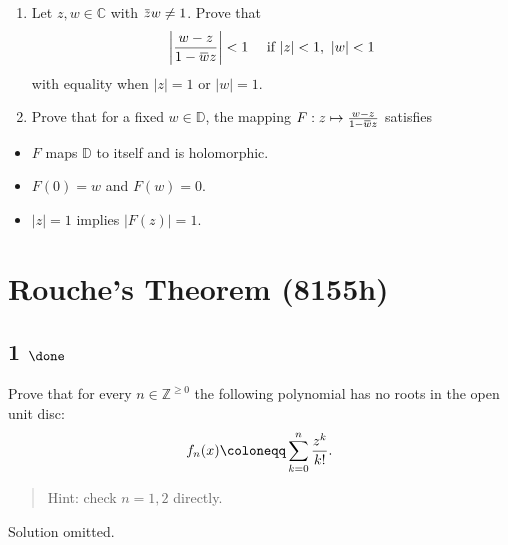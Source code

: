 \begin{enumerate}
\def\labelenumi{\alph{enumi}.}
\item
  Let \(z, w \in {\mathbb{C}}\) with
  \(\mkern 1.5mu\overline{\mkern-1.5muz\mkern-1.5mu}\mkern 1.5mu w \neq 1\).
  Prove that
  \begin{align*}
  {\left\lvert {w-z \over 1 - \mkern 1.5mu\overline{\mkern-1.5muw\mkern-1.5mu}\mkern 1.5mu z} \right\rvert} < 1 \quad\text{ if } {\left\lvert {z} \right\rvert}<1,~ {\left\lvert {w} \right\rvert} < 1
  \end{align*}
  with equality when \({\left\lvert {z} \right\rvert} = 1\) or
  \({\left\lvert {w} \right\rvert} = 1\).
\item
  Prove that for a fixed \(w\in {\mathbb{D}}\), the mapping
  \(F: z\mapsto {w-z \over 1 - \mkern 1.5mu\overline{\mkern-1.5muw\mkern-1.5mu}\mkern 1.5mu z}\)
  satisfies
\end{enumerate}

\begin{itemize}
\tightlist
\item
  \(F\) maps \({\mathbb{D}}\) to itself and is holomorphic.
\item
  \(F(0) = w\) and \(F(w) = 0\).
\item
  \({\left\lvert {z} \right\rvert} = 1\) implies
  \({\left\lvert {F(z)} \right\rvert} = 1\).
\end{itemize}

\hypertarget{rouches-theorem-8155h}{%
\section{Rouche's Theorem (8155h)}\label{rouches-theorem-8155h}}

\hypertarget{done-9}{%
\subsection{\texorpdfstring{1
\(\done\)}{1 \textbackslash done}}\label{done-9}}

Prove that for every \(n\in {\mathbb{Z}}^{\geq 0}\) the following
polynomial has no roots in the open unit disc:
\begin{align*}
f_n(x) \coloneqq\sum_{k=0}^n {z^k \over k!}
.\end{align*}

\begin{quote}
Hint: check \(n=1,2\) directly.
\end{quote}

Solution omitted.

